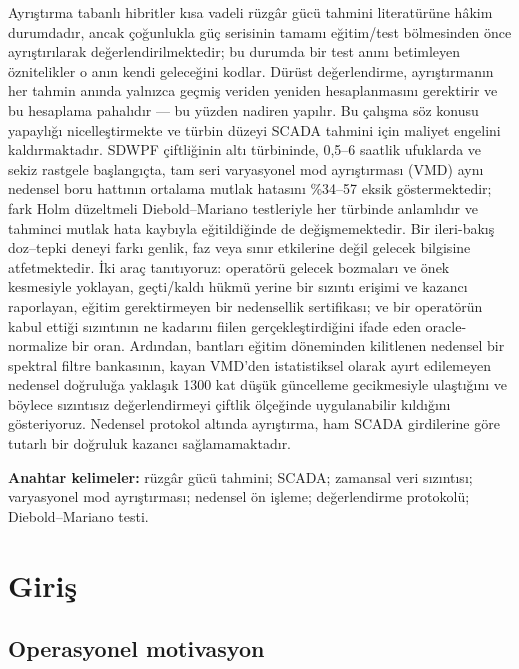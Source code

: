 \documentclass[11pt,a4paper]{article}
\begin{document}
Ayrıştırma tabanlı hibritler kısa vadeli rüzgâr gücü tahmini literatürüne hâkim
durumdadır, ancak çoğunlukla güç serisinin tamamı eğitim/test bölmesinden önce
ayrıştırılarak değerlendirilmektedir; bu durumda bir test anını betimleyen
öznitelikler o anın kendi geleceğini kodlar. Dürüst değerlendirme, ayrıştırmanın
her tahmin anında yalnızca geçmiş veriden yeniden hesaplanmasını gerektirir ve
bu hesaplama pahalıdır --- bu yüzden nadiren yapılır. Bu çalışma söz konusu
yapaylığı nicelleştirmekte ve türbin düzeyi SCADA tahmini için maliyet engelini
kaldırmaktadır. SDWPF çiftliğinin altı türbininde, 0,5--6 saatlik ufuklarda ve
sekiz rastgele başlangıçta, tam seri varyasyonel mod ayrıştırması (VMD) aynı
nedensel boru hattının ortalama mutlak hatasını \%34--57 eksik göstermektedir;
fark Holm düzeltmeli Diebold--Mariano testleriyle her türbinde anlamlıdır ve
tahminci mutlak hata kaybıyla eğitildiğinde de değişmemektedir. Bir ileri-bakış
doz--tepki deneyi farkı genlik, faz veya sınır etkilerine değil gelecek
bilgisine atfetmektedir. İki araç tanıtıyoruz: operatörü gelecek bozmaları ve
önek kesmesiyle yoklayan, geçti/kaldı hükmü yerine bir sızıntı erişimi ve
kazancı raporlayan, eğitim gerektirmeyen bir nedensellik sertifikası; ve bir
operatörün kabul ettiği sızıntının ne kadarını fiilen gerçekleştirdiğini ifade
eden oracle-normalize bir oran. Ardından, bantları eğitim döneminden kilitlenen
nedensel bir spektral filtre bankasının, kayan VMD'den istatistiksel olarak
ayırt edilemeyen nedensel doğruluğa yaklaşık 1300 kat düşük güncelleme
gecikmesiyle ulaştığını ve böylece sızıntısız değerlendirmeyi çiftlik ölçeğinde
uygulanabilir kıldığını gösteriyoruz. Nedensel protokol altında ayrıştırma, ham
SCADA girdilerine göre tutarlı bir doğruluk kazancı sağlamamaktadır.

\textbf{Anahtar kelimeler:} rüzgâr gücü tahmini; SCADA; zamansal veri sızıntısı;
varyasyonel mod ayrıştırması; nedensel ön işleme; değerlendirme protokolü;
Diebold--Mariano testi.

\section{Giriş}

\subsection{Operasyonel motivasyon}
\end{document}
